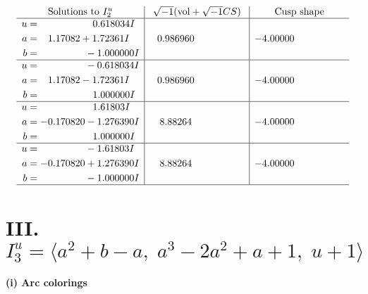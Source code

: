 \documentclass[1p]{elsarticle_modified}
\theoremstyle{definition}
\newcommand{\I}{\sqrt{-1}}
\begin{document}
$$\begin{array}{c|c|c}  
\text{Solutions to }I^u_{2}& \I (\text{vol} + \sqrt{-1}CS) & \text{Cusp shape}\\
 \hline 
\begin{aligned}
u &= \phantom{-0.000000 -}0.618034 I \\
a &= \phantom{-}1.17082 + 1.72361 I \\
b &= \phantom{-0.000000 } -1.000000 I\end{aligned}
 & \phantom{-}0.986960\phantom{ +0.000000I} & -4.00000\phantom{ +0.000000I} \\ \hline\begin{aligned}
u &= \phantom{-0.000000 } -0.618034 I \\
a &= \phantom{-}1.17082 - 1.72361 I \\
b &= \phantom{-0.000000 -}1.000000 I\end{aligned}
 & \phantom{-}0.986960\phantom{ +0.000000I} & -4.00000\phantom{ +0.000000I} \\ \hline\begin{aligned}
u &= \phantom{-0.000000 -}1.61803 I \\
a &= -0.170820 - 1.276390 I \\
b &= \phantom{-0.000000 -}1.000000 I\end{aligned}
 & \phantom{-}8.88264\phantom{ +0.000000I} & -4.00000\phantom{ +0.000000I} \\ \hline\begin{aligned}
u &= \phantom{-0.000000 } -1.61803 I \\
a &= -0.170820 + 1.276390 I \\
b &= \phantom{-0.000000 } -1.000000 I\end{aligned}
 & \phantom{-}8.88264\phantom{ +0.000000I} & -4.00000\phantom{ +0.000000I}\\
 \hline 
 \end{array}$$\newpage\newpage\renewcommand{\arraystretch}{1}
\centering \section*{III. $I^u_{3}= \langle a^2+b- a,\;a^3-2 a^2+a+1,\;u+1 \rangle$}
\flushleft \textbf{(i) Arc colorings}\\
\end{document}

